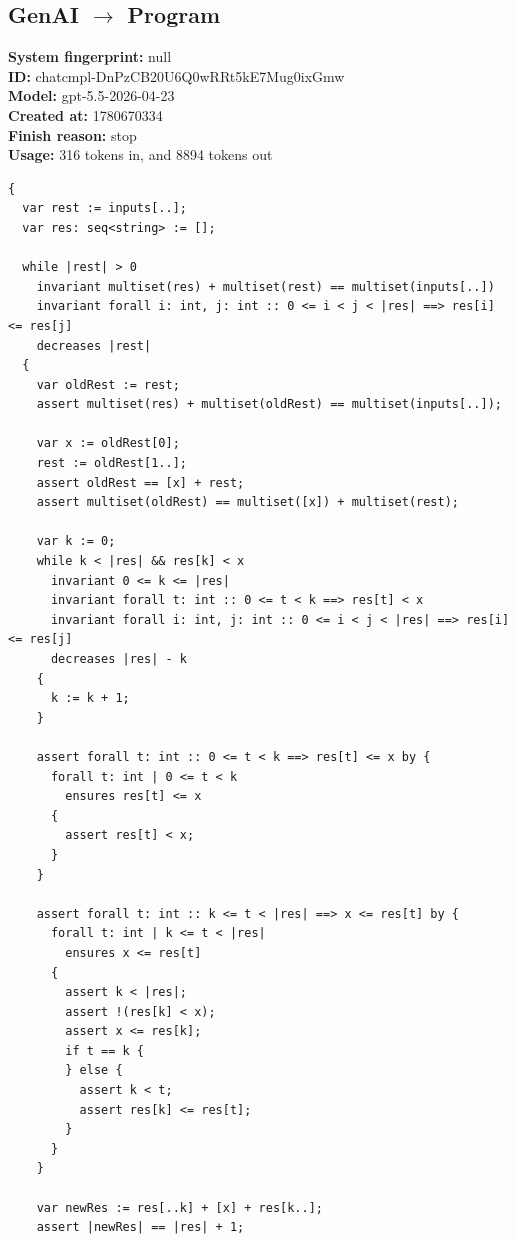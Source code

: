 \documentclass{article}
\begin{document}
\subsection*{GenAI $\rightarrow$ Program}
\textbf{System fingerprint: }null
\\\textbf{ID: }chatcmpl-DnPzCB20U6Q0wRRt5kE7Mug0ixGmw
\\\textbf{Model: }gpt-5.5-2026-04-23
\\\textbf{Created at: }1780670334
\\\textbf{Finish reason: }stop
\\\textbf{Usage: }316 tokens in, and 8894 tokens out
\begin{lstlisting}
{
  var rest := inputs[..];
  var res: seq<string> := [];

  while |rest| > 0
    invariant multiset(res) + multiset(rest) == multiset(inputs[..])
    invariant forall i: int, j: int :: 0 <= i < j < |res| ==> res[i] <= res[j]
    decreases |rest|
  {
    var oldRest := rest;
    assert multiset(res) + multiset(oldRest) == multiset(inputs[..]);

    var x := oldRest[0];
    rest := oldRest[1..];
    assert oldRest == [x] + rest;
    assert multiset(oldRest) == multiset([x]) + multiset(rest);

    var k := 0;
    while k < |res| && res[k] < x
      invariant 0 <= k <= |res|
      invariant forall t: int :: 0 <= t < k ==> res[t] < x
      invariant forall i: int, j: int :: 0 <= i < j < |res| ==> res[i] <= res[j]
      decreases |res| - k
    {
      k := k + 1;
    }

    assert forall t: int :: 0 <= t < k ==> res[t] <= x by {
      forall t: int | 0 <= t < k
        ensures res[t] <= x
      {
        assert res[t] < x;
      }
    }

    assert forall t: int :: k <= t < |res| ==> x <= res[t] by {
      forall t: int | k <= t < |res|
        ensures x <= res[t]
      {
        assert k < |res|;
        assert !(res[k] < x);
        assert x <= res[k];
        if t == k {
        } else {
          assert k < t;
          assert res[k] <= res[t];
        }
      }
    }

    var newRes := res[..k] + [x] + res[k..];
    assert |newRes| == |res| + 1;


\end{lstlisting}
\end{document}
